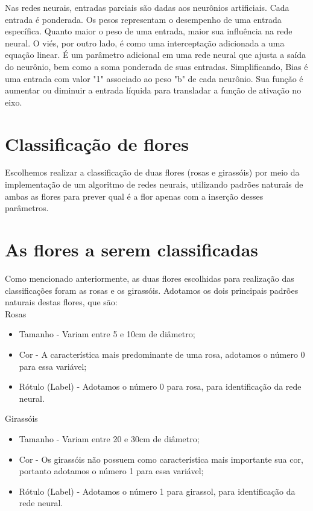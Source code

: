 \documentclass[12pt]{article}
\begin{document}
Nas redes neurais, entradas parciais são dadas aos neurônios artificiais. Cada entrada é ponderada. Os pesos representam o desempenho de uma entrada específica. Quanto maior o peso de uma entrada, maior sua influência na rede neural. O viés, por outro lado, é como uma interceptação adicionada a uma equação linear. É um parâmetro adicional em uma rede neural que ajusta a saída do neurônio, bem como a soma ponderada de suas entradas. Simplificando, Bias é uma entrada com valor "1" associado ao peso "b" de cada neurônio. Sua função é aumentar ou diminuir a entrada líquida para transladar a função de ativação no eixo.

\section{Classificação de flores}

Escolhemos realizar a classificação de duas flores (rosas e girassóis) por meio da implementação de um algoritmo de redes neurais, utilizando padrões naturais de ambas as flores para prever qual é a flor apenas com a inserção desses parâmetros.

\section{As flores a serem classificadas}

Como mencionado anteriormente, as duas flores escolhidas para realização das classificações foram as rosas e os girassóis. Adotamos os dois principais padrões naturais destas flores, que são:\\

Rosas
\begin{itemize}
    \item Tamanho - Variam entre 5 e 10cm de diâmetro;
    \item Cor - A característica mais predominante de uma rosa, adotamos o número 0 para essa variável;
    \item Rótulo (Label) - Adotamos o número 0 para rosa, para identificação da rede neural.
\end{itemize}

Girassóis
\begin{itemize}
    \item Tamanho - Variam entre 20 e 30cm de diâmetro;
    \item Cor - Os girassóis não possuem como característica mais importante sua cor, portanto adotamos o número 1 para essa variável;
    \item Rótulo (Label) - Adotamos o número 1 para girassol, para identificação da rede neural.
\end{itemize}
\end{document}
